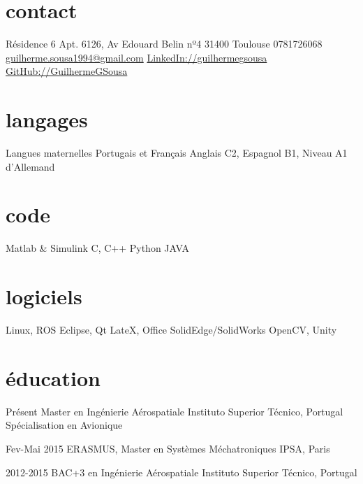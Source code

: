 \documentclass[a4paper]{friggeri-cv} %
\begin{document}


\begin{aside} %
\section{contact}
Résidence 6 Apt. 6126, Av Edouard Belin nº4
31400 Toulouse
0781726068
\href{mailto:guilherme.sousa1994@gmail.com}{guilherme.sousa1994\newline @gmail.com}
\href{https://www.linkedin.com/in/guilhermegsousa}{LinkedIn://guilhermegsousa}
\href{https://github.com/GuilhermeGSousa}{GitHub://GuilhermeGSousa}
\section{langages}
Langues maternelles Portugais et Français 
Anglais C2,
Espagnol B1,
Niveau A1 d'Allemand
\section{code}
Matlab \& Simulink
C, C++
Python
JAVA
\section{logiciels}
Linux, ROS
Eclipse, Qt
LateX, Office
SolidEdge/SolidWorks
OpenCV, Unity
\end{aside}


\section{éducation}

\begin{entrylist}


\entry
{Présent}
{Master {\normalfont en Ingénierie Aérospatiale}}
{Instituto Superior Técnico, Portugal}
{Spécialisation en Avionique}%


\entry
{Fev-Mai 2015}
{ERASMUS, Master {\normalfont en Systèmes Méchatroniques} }
{IPSA, Paris}
{}

\entry
{2012-2015}
{BAC+3 {\normalfont en Ingénierie Aérospatiale}}
{Instituto Superior Técnico, Portugal}
{}


\end{entrylist}
\end{document}
